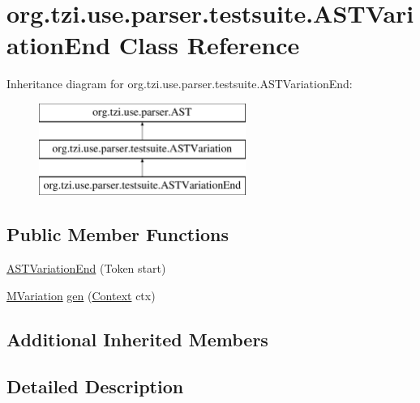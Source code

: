 \hypertarget{classorg_1_1tzi_1_1use_1_1parser_1_1testsuite_1_1_a_s_t_variation_end}{\section{org.\-tzi.\-use.\-parser.\-testsuite.\-A\-S\-T\-Variation\-End Class Reference}
\label{classorg_1_1tzi_1_1use_1_1parser_1_1testsuite_1_1_a_s_t_variation_end}
}
Inheritance diagram for org.\-tzi.\-use.\-parser.\-testsuite.\-A\-S\-T\-Variation\-End\-:\begin{figure}[H]
\begin{center}
\leavevmode
\includegraphics[height=3.000000cm]{classorg_1_1tzi_1_1use_1_1parser_1_1testsuite_1_1_a_s_t_variation_end}
\end{center}
\end{figure}
\subsection*{Public Member Functions}
\begin{DoxyCompactItemize}
\item 
\hyperlink{classorg_1_1tzi_1_1use_1_1parser_1_1testsuite_1_1_a_s_t_variation_end_a967258f686a3b73777085cec7d45c6cf}{A\-S\-T\-Variation\-End} (Token start)
\item 
\hyperlink{classorg_1_1tzi_1_1use_1_1uml_1_1sys_1_1testsuite_1_1_m_variation}{M\-Variation} \hyperlink{classorg_1_1tzi_1_1use_1_1parser_1_1testsuite_1_1_a_s_t_variation_end_ad8455318d235c8dc2a5e3029b6792fbe}{gen} (\hyperlink{classorg_1_1tzi_1_1use_1_1parser_1_1_context}{Context} ctx)
\end{DoxyCompactItemize}
\subsection*{Additional Inherited Members}


\subsection{Detailed Description}


